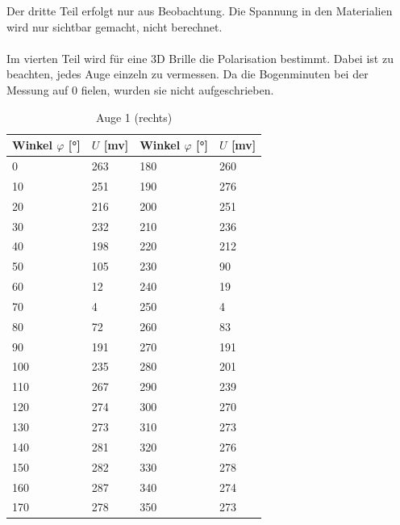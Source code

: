 \documentclass[12pt,a4paper,twoside]{article}
\begin{document}
\noindent
Der dritte Teil erfolgt nur aus Beobachtung. Die Spannung in den Materialien wird nur sichtbar gemacht, nicht berechnet. 
\\
\\
Im vierten Teil wird für eine 3D Brille die Polarisation bestimmt. Dabei ist zu beachten, jedes Auge einzeln zu vermessen. 
Da die Bogenminuten bei der Messung auf 0 fielen, wurden sie nicht aufgeschrieben. 
\begin{table}[H]
    \centering
    \caption{Auge 1 (rechts)}
    \label{tab:Messdaten Auge rechts}
    \begin{tabular}{| l | l | l | l |}
        \hline
        Winkel $\varphi$ [°] & $U$ [mv] & Winkel $\varphi$ [°] & $U$ [mv] \\
        \hline
        0           & 263  & 180   & 260  \\
        10          & 251  & 190   & 276  \\
        20          & 216  & 200   & 251  \\
        30          & 232  & 210   & 236  \\
        40          & 198  & 220   & 212  \\
        50          & 105  & 230   & 90  \\
        60          & 12   & 240   & 19  \\
        70          & 4    & 250   & 4  \\
        80          & 72   & 260   & 83  \\
        90          & 191  & 270   & 191  \\
        100         & 235  & 280   & 201  \\
        110         & 267  & 290   & 239  \\
        120         & 274  & 300   & 270  \\
        130         & 273  & 310   & 273  \\
        140         & 281  & 320   & 276  \\
        150         & 282  & 330   & 278  \\
        160         & 287  & 340   & 274  \\
        170         & 278  & 350   & 273  \\
        \hline
    \end{tabular}
\end{table}
\end{document}
